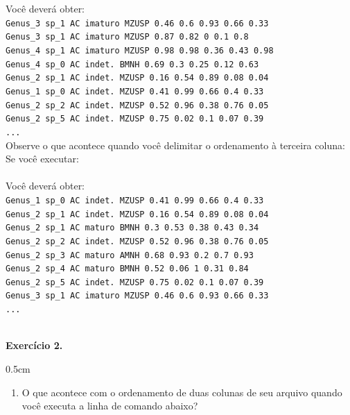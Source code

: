 \begin{refsection}
Você deverá obter:\\
\texttt{Genus\_3	sp\_1	AC	imaturo	MZUSP	0.46	0.6	0.93	0.66	0.33}\\
\texttt{Genus\_3	sp\_1	AC	imaturo	MZUSP	0.87	0.82	0	0.1	0.8}\\
\texttt{Genus\_4	sp\_1	AC	imaturo	MZUSP	0.98	0.98	0.36	0.43	0.98}\\
\texttt{Genus\_4	sp\_0	AC	indet.	BMNH	0.69	0.3	0.25	0.12	0.63}\\
\texttt{Genus\_2	sp\_1	AC	indet.	MZUSP	0.16	0.54	0.89	0.08	0.04}\\
\texttt{Genus\_1	sp\_0	AC	indet.	MZUSP	0.41	0.99	0.66	0.4	0.33}\\
\texttt{Genus\_2	sp\_2	AC	indet.	MZUSP	0.52	0.96	0.38	0.76	0.05}\\
\texttt{Genus\_2	sp\_5	AC	indet.	MZUSP	0.75	0.02	0.1	0.07	0.39}\\
\texttt{...}\\

Observe o que acontece quando você delimitar o ordenamento à terceira coluna:\\

Se você executar:\\
\\

Você deverá obter:\\
\texttt{Genus\_1	sp\_0	AC	indet.	MZUSP	0.41	0.99	0.66	0.4	0.33}\\
\texttt{Genus\_2	sp\_1	AC	indet.	MZUSP	0.16	0.54	0.89	0.08	0.04}\\
\texttt{Genus\_2	sp\_1	AC	maturo	BMNH	0.3	0.53	0.38	0.43	0.34}\\
\texttt{Genus\_2	sp\_2	AC	indet.	MZUSP	0.52	0.96	0.38	0.76	0.05}\\
\texttt{Genus\_2	sp\_3	AC	maturo	AMNH	0.68	0.93	0.2	0.7	0.93}\\
\texttt{Genus\_2	sp\_4	AC	maturo	BMNH	0.52	0.06	1	0.31	0.84}\\
\texttt{Genus\_2	sp\_5	AC	indet.	MZUSP	0.75	0.02	0.1	0.07	0.39}\\
\texttt{Genus\_3	sp\_1	AC	imaturo	MZUSP	0.46	0.6	0.93	0.66	0.33}\\
\texttt{...}\\\

\begin{blackBlock}{\textbf{Exercício 2.}}\label{tut2:ex:2.\arabic{ex}}

\begin {myindentpar}{0.5cm}
\begin{enumerate}[\itshape i.]
 \item{O que acontece com o ordenamento de duas colunas de seu arquivo quando você executa a linha de comando abaixo?}\label{tut2:text:editors:texttools:sort:ex1}\\
\\


\end{enumerate}
\end{myindentpar}
\end{blackBlock}
\end{refsection}

